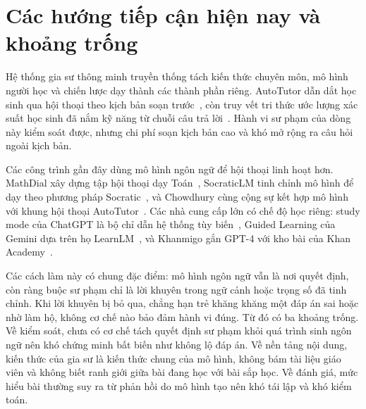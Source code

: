 \section{Các hướng tiếp cận hiện nay và khoảng trống}
Hệ thống gia sư thông minh truyền thống tách kiến thức chuyên môn, mô hình người học và chiến lược dạy thành các thành phần riêng. AutoTutor dẫn dắt học sinh qua hội thoại theo kịch bản soạn trước~\cite{graesser2005}, còn truy vết tri thức ước lượng xác suất học sinh đã nắm kỹ năng từ chuỗi câu trả lời~\cite{corbett1995,piech2015}. Hành vi sư phạm của dòng này kiểm soát được, nhưng chi phí soạn kịch bản cao và khó mở rộng ra câu hỏi ngoài kịch bản.

Các công trình gần đây dùng mô hình ngôn ngữ để hội thoại linh hoạt hơn. MathDial xây dựng tập hội thoại dạy Toán~\cite{macina2023}, SocraticLM tinh chỉnh mô hình để dạy theo phương pháp Socratic~\cite{liu2024socratic}, và Chowdhury cùng cộng sự kết hợp mô hình với khung hội thoại AutoTutor~\cite{chowdhury2024}. Các nhà cung cấp lớn có chế độ học riêng: study mode của ChatGPT là bộ chỉ dẫn hệ thống tùy biến~\cite{studymode}, Guided Learning của Gemini dựa trên họ LearnLM~\cite{guidedlearning,jurenka2024}, và Khanmigo gắn GPT-4 với kho bài của Khan Academy~\cite{khanmigo}.

Các cách làm này có chung đặc điểm: mô hình ngôn ngữ vẫn là nơi quyết định, còn ràng buộc sư phạm chỉ là lời khuyên trong ngữ cảnh hoặc trọng số đã tinh chỉnh. Khi lời khuyên bị bỏ qua, chẳng hạn trẻ khăng khăng một đáp án sai hoặc nhờ làm hộ, không cơ chế nào bảo đảm hành vi đúng. Từ đó có ba khoảng trống. Về kiểm soát, chưa có cơ chế tách quyết định sư phạm khỏi quá trình sinh ngôn ngữ nên khó chứng minh bất biến như không lộ đáp án. Về nền tảng nội dung, kiến thức của gia sư là kiến thức chung của mô hình, không bám tài liệu giáo viên và không biết ranh giới giữa bài đang học với bài sắp học. Về đánh giá, mức hiểu bài thường suy ra từ phản hồi do mô hình tạo nên khó tái lập và khó kiểm toán.

